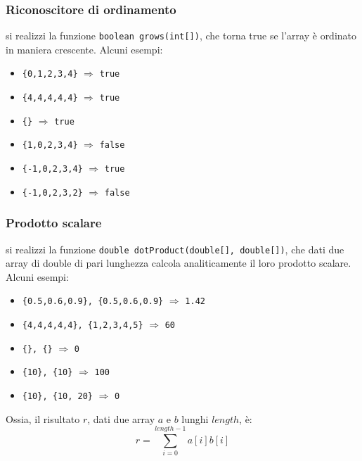 \documentclass{beamer}
\begin{document}
\begin{frame}[fragile]
\frametitle{Riconoscitore di ordinamento}
 si realizzi la funzione \texttt{boolean grows(int[])}, che torna true se l'array è ordinato in maniera crescente. Alcuni esempi:
\begin{itemize}
 \item \texttt{\{0,1,2,3,4\}} $\Rightarrow$ \texttt{true}
 \item \texttt{\{4,4,4,4,4\}} $\Rightarrow$ \texttt{true}
 \item \texttt{\{\}} $\Rightarrow$ \texttt{true}
 \item \texttt{\{1,0,2,3,4\}} $\Rightarrow$ \texttt{false}
 \item \texttt{\{-1,0,2,3,4\}} $\Rightarrow$ \texttt{true}
 \item \texttt{\{-1,0,2,3,2\}} $\Rightarrow$ \texttt{false}
\end{itemize}
\end{frame}

\begin{frame}[fragile]
\frametitle{Prodotto scalare}
 si realizzi la funzione \texttt{double dotProduct(double[], double[])}, che dati due array di double di pari lunghezza calcola analiticamente il loro prodotto scalare. Alcuni esempi:
\begin{itemize}
 \item \texttt{\{0.5,0.6,0.9\}, \{0.5,0.6,0.9\}} $\Rightarrow$ \texttt{1.42}
 \item \texttt{\{4,4,4,4,4\}, \{1,2,3,4,5\}} $\Rightarrow$ \texttt{60}
 \item \texttt{\{\}, \{\}} $\Rightarrow$ \texttt{0}
 \item \texttt{\{10\}, \{10\}} $\Rightarrow$ \texttt{100}
 \item \texttt{\{10\}, \{10, 20\}} $\Rightarrow$ \texttt{0}
\end{itemize}
Ossia, il risultato $r$, dati due array $a$ e $b$ lunghi $length$, è:
$$
r = \sum_{i=0}^{length-1}{a[i]b[i]}
$$
\end{frame}
\end{document}
